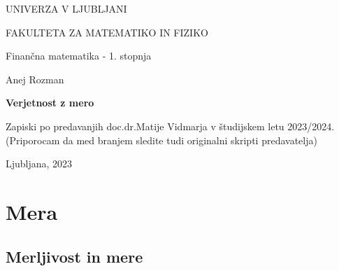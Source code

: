\documentclass[a4paper,12pt]{article}
\theoremstyle{definition} %
\theoremstyle{plain} %
\begin{document}
\begin{titlepage}
    UNIVERZA V LJUBLJANI
  
    FAKULTETA ZA MATEMATIKO IN FIZIKO
  
    \vspace{0.5cm}
    Finančna matematika - 1. stopnja
  
    \begin{center}
        \vspace{7cm}
            Anej Rozman
  
        \vspace{0.4cm}
        \textbf{\Large{Verjetnost z mero}}
        \vspace{0.3cm}
  
        Zapiski po predavanjih doc.\@ dr.\@ Matije Vidmarja v študijskem letu 2023/2024.
        (Priporocam da med branjem sledite tudi originalni skripti predavatelja)
    \end{center}
    \vfill
        Ljubljana, 2023     
    \thispagestyle{empty}
\end{titlepage}

\newpage
  
\tableofcontents
   
\newpage
    
\section{Mera}
    \subsection{Merljivost in mere}
\end{document}
